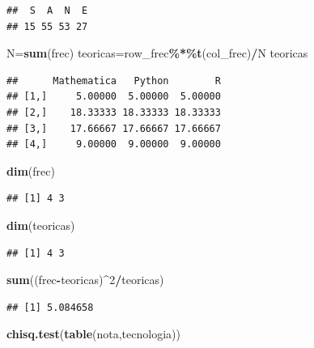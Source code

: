 \documentclass[
]{article}
\newenvironment{Shaded}{\begin{snugshade}}{\end{snugshade}}
\newcommand{\DecValTok}[1]{\textcolor[rgb]{0.00,0.00,0.81}{#1}}
\newcommand{\KeywordTok}[1]{\textcolor[rgb]{0.13,0.29,0.53}{\textbf{#1}}}
\newcommand{\NormalTok}[1]{#1}
\newcommand{\OperatorTok}[1]{\textcolor[rgb]{0.81,0.36,0.00}{\textbf{#1}}}
\begin{document}
\begin{verbatim}
##  S  A  N  E 
## 15 55 53 27
\end{verbatim}

\begin{Shaded}
\begin{Highlighting}[]
\NormalTok{N=}\KeywordTok{sum}\NormalTok{(frec)}
\NormalTok{teoricas=row\_frec}\OperatorTok{\%*\%}\KeywordTok{t}\NormalTok{(col\_frec)}\OperatorTok{/}\NormalTok{N}
\NormalTok{teoricas}
\end{Highlighting}
\end{Shaded}

\begin{verbatim}
##      Mathematica   Python        R
## [1,]     5.00000  5.00000  5.00000
## [2,]    18.33333 18.33333 18.33333
## [3,]    17.66667 17.66667 17.66667
## [4,]     9.00000  9.00000  9.00000
\end{verbatim}

\begin{Shaded}
\begin{Highlighting}[]
\KeywordTok{dim}\NormalTok{(frec)}
\end{Highlighting}
\end{Shaded}

\begin{verbatim}
## [1] 4 3
\end{verbatim}

\begin{Shaded}
\begin{Highlighting}[]
\KeywordTok{dim}\NormalTok{(teoricas)}
\end{Highlighting}
\end{Shaded}

\begin{verbatim}
## [1] 4 3
\end{verbatim}

\begin{Shaded}
\begin{Highlighting}[]
\KeywordTok{sum}\NormalTok{((frec}\OperatorTok{{-}}\NormalTok{teoricas)}\OperatorTok{\^{}}\DecValTok{2}\OperatorTok{/}\NormalTok{teoricas)}
\end{Highlighting}
\end{Shaded}

\begin{verbatim}
## [1] 5.084658
\end{verbatim}

\begin{Shaded}
\begin{Highlighting}[]
\KeywordTok{chisq.test}\NormalTok{(}\KeywordTok{table}\NormalTok{(nota,tecnologia))}
\end{Highlighting}
\end{Shaded}
\end{document}
